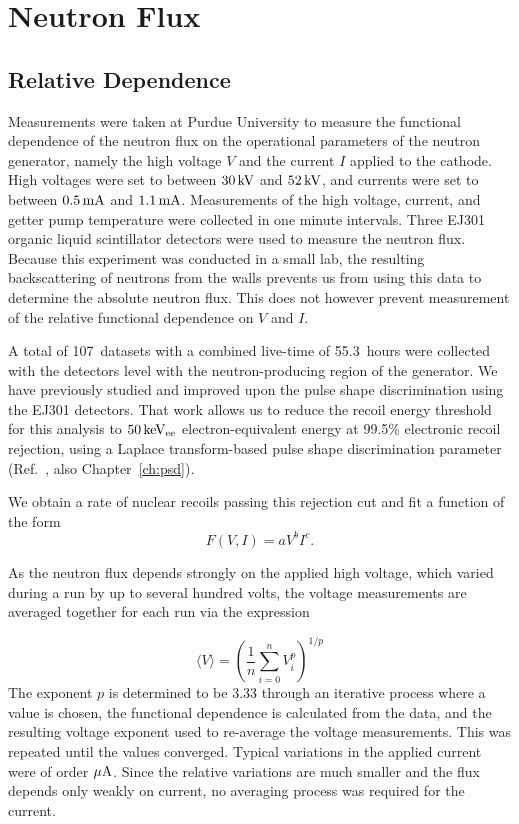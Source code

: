 \section{Neutron Flux}\label{sec:flux}

\subsection{Relative Dependence}\label{sec:relativeflux}

Measurements were taken at Purdue University to measure the functional dependence of the neutron flux on the operational parameters of the neutron generator, namely the high voltage $V$ and the current $I$ applied to the cathode. High voltages were set to between $30\,\mathrm{kV}$ and $52\,\mathrm{kV}$, and currents were set to between $0.5\,\mathrm{mA}$ and $1.1\,\mathrm{mA}$. Measurements of the high voltage, current, and getter pump temperature were collected in one minute intervals. Three EJ301 organic liquid scintillator detectors were used to measure the neutron flux. Because this experiment was conducted in a small lab, the resulting backscattering of neutrons from the walls prevents us from using this data to determine the absolute neutron flux. This does not however prevent measurement of the relative functional dependence on $V$ and $I$.

A total of 107~datasets with a combined live-time of 55.3~hours were collected with the detectors level with the neutron-producing region of the generator. We have previously studied and improved upon the pulse shape discrimination using the EJ301 detectors. That work allows us to reduce the recoil energy threshold for this analysis to $50\,\mathrm{keV_{ee}}$ electron-equivalent energy at 99.5\% electronic recoil rejection, using a Laplace transform-based pulse shape discrimination parameter (Ref.~\cite{Lang:2016xks}, also Chapter~\ref{ch:psd}).

We obtain a rate of nuclear recoils passing this rejection cut and fit a function of the form
\begin{equation} \label{eq:rate}
F(V,I) = aV^b I^c.
\end{equation}

As the neutron flux depends strongly on the applied high voltage, which varied during a run by up to several hundred volts, the voltage measurements are averaged together for each run via the expression

\begin{equation}
\langle V \rangle = \left(\frac{1}{n}\sum\limits_{i=0}^n V_i^p \right)^{1/p}
\end{equation}
The exponent $p$ is determined to be 3.33 through an iterative process where a value is chosen, the functional dependence is calculated from the data, and the resulting voltage exponent used to re-average the voltage measurements. This was repeated until the values converged. Typical variations in the applied current were of order $\mathrm{\mu A}$. Since the relative variations are much smaller and the flux depends only weakly on current, no averaging process was required for the current.

